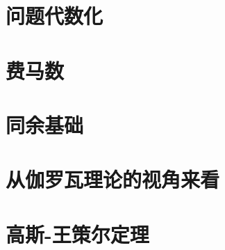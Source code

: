 \documentclass[cn,fancy,blue,11pt]{elegantbook}
\begin{document}
\section{问题代数化}

\section{费马数}

\section{同余基础}

\section{从伽罗瓦理论的视角来看}

\section{高斯-王策尔定理}
\end{document}
